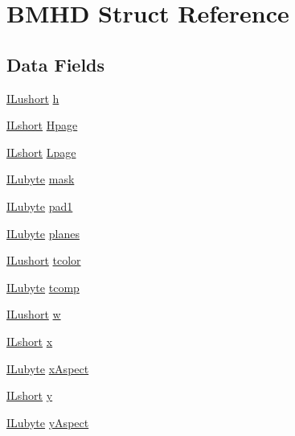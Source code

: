 \hypertarget{struct_b_m_h_d}{\section{B\-M\-H\-D Struct Reference}
\label{struct_b_m_h_d}
}
\subsection*{Data Fields}
\begin{DoxyCompactItemize}
\item 
\hyperlink{il_8h_af6287b43748354a7c4864da43ae56962}{I\-Lushort} \hyperlink{struct_b_m_h_d_a88c66af3b490ec9f8c011e646d75a99c}{h}
\item 
\hyperlink{il_8h_afc75ded918970afe7517d3f7f0561db3}{I\-Lshort} \hyperlink{struct_b_m_h_d_a997cf8e784e63092a5056748569808da}{Hpage}
\item 
\hyperlink{il_8h_afc75ded918970afe7517d3f7f0561db3}{I\-Lshort} \hyperlink{struct_b_m_h_d_a1b9806f908c0ffce82a998618c3a2c2a}{Lpage}
\item 
\hyperlink{il_8h_a8d2f04500100a86d1b00e98ab1b15a33}{I\-Lubyte} \hyperlink{struct_b_m_h_d_a6daf81b31bb6587923612db0ce9c56c0}{mask}
\item 
\hyperlink{il_8h_a8d2f04500100a86d1b00e98ab1b15a33}{I\-Lubyte} \hyperlink{struct_b_m_h_d_afec1b929613c848fe533ccc070ad7e6f}{pad1}
\item 
\hyperlink{il_8h_a8d2f04500100a86d1b00e98ab1b15a33}{I\-Lubyte} \hyperlink{struct_b_m_h_d_a104a6c0174090bda4a037dc41e2da53f}{planes}
\item 
\hyperlink{il_8h_af6287b43748354a7c4864da43ae56962}{I\-Lushort} \hyperlink{struct_b_m_h_d_a496156f3b6a8f5111489a4e3a1189cde}{tcolor}
\item 
\hyperlink{il_8h_a8d2f04500100a86d1b00e98ab1b15a33}{I\-Lubyte} \hyperlink{struct_b_m_h_d_a0d153200c2b9b7803fc77cff5c1c3f37}{tcomp}
\item 
\hyperlink{il_8h_af6287b43748354a7c4864da43ae56962}{I\-Lushort} \hyperlink{struct_b_m_h_d_afe8d0ba55b6dfa9b92e8fd55e9cad81f}{w}
\item 
\hyperlink{il_8h_afc75ded918970afe7517d3f7f0561db3}{I\-Lshort} \hyperlink{struct_b_m_h_d_a8056f1981e13496dbb9b2ca184223b27}{x}
\item 
\hyperlink{il_8h_a8d2f04500100a86d1b00e98ab1b15a33}{I\-Lubyte} \hyperlink{struct_b_m_h_d_a37b98613fa29d5c405698a709d4940a7}{x\-Aspect}
\item 
\hyperlink{il_8h_afc75ded918970afe7517d3f7f0561db3}{I\-Lshort} \hyperlink{struct_b_m_h_d_a5a8f8a453c9ee9e3e00eb84f2cfbd059}{y}
\item 
\hyperlink{il_8h_a8d2f04500100a86d1b00e98ab1b15a33}{I\-Lubyte} \hyperlink{struct_b_m_h_d_a0e869e0f77388aaee790b3f51baf739b}{y\-Aspect}
\end{DoxyCompactItemize}


